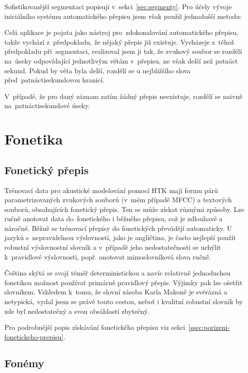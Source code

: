 Sofistikovanější segmentaci popisuji v~sekci~\ref{sec:segmenty}. Pro účely
vývoje iniciálního systému automatického přepisu jsem však použil jednodušší
metodu:

Celá aplikace je pojata jako nástroj pro~zdokonalování automatického přepisu,
takže vychází z~předpokladu, že nějaký přepis již existuje. Vycházeje z~téhož
předpokladu při~segmentaci, realizoval jsem ji tak, že zvukový soubor se rozdělí
na~úseky odpovídající jednotlivým větám v~přepisu, ne však delší než patnáct
sekund. Pokud by věta byla delší, rozdělí se u nejbližšího slova
před~patnáctisekundovou hranicí.

V~případě, že pro daný záznam zatím žádný přepis neexistuje, rozdělí se naivně
na~patnáctisekundové úseky.

\section{Fonetika}
\label{sec:ac:fonetika}

\subsection{Fonetický přepis}

Trénovací data pro akustické modelování pomocí HTK mají formu párů
parametrizovaných zvukových souborů (v~mém případě MFCC) a textových souborů,
obsahujících fonetický přepis. Ten se může získat různými způsoby. Lze ručně
anotovat data do~fonetického i běžného přepisu, což je zdlouhavé a náročné. Běžně
se trénovací přepisy do fonetických převádějí automaticky. U jazyků
s~nepravidelnou výslovností, jako je angličtina, je často nejlepší použít
robustní výslovnostní slovník a v~případě jeho nedostatečnosti se uchýlit
k~pravidlové výslovnosti, popř. anotovat mimoslovníková slova ručně.

Čeština skýtá se svojí téměř deterministickou a navíc relativně jednoduchou
fonetikou možnost používat primárně pravidlový přepis. Výjimky pak lze ošetřit
slovníkem. Vzhledem k~tomu, že slovní zásoba Karla Makoně je svérázná a
netypická, vydal jsem se právě touto cestou, neboť i kvalitní robustní slovník
by zde byl nedostatečný a svou obsáhlostí zbytečný.

Pro podrobnější popis získávání fonetického přepisu viz sekci~\ref{ssec:porizeni-fonetickeho-prepisu}.

\subsection{Fonémy}

